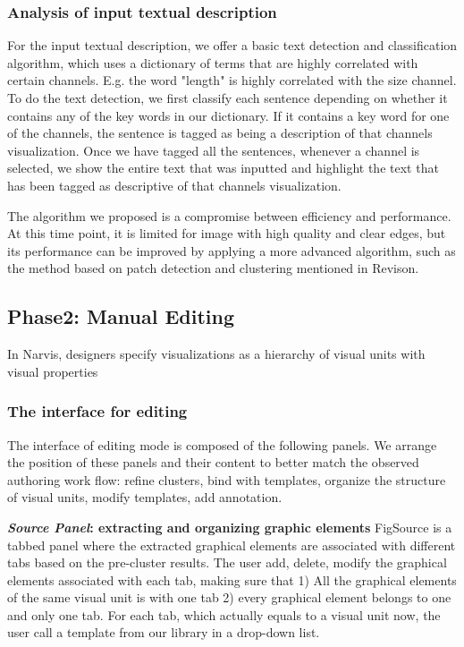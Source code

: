 \subsubsection{Analysis of input textual description}
For the input textual description, we offer a basic text detection and classification algorithm, which uses a dictionary of terms that are highly correlated with certain channels. E.g. the word "length" is highly correlated with the size channel. To do the text detection, we first classify each sentence depending on whether it contains any of the key words in our dictionary. If it contains a key word for one of the channels, the sentence is tagged as being a description of that channels visualization. Once we have tagged all the sentences, whenever a channel is selected, we show the entire text that was inputted and highlight the text that has been tagged as descriptive of that channels visualization.

The algorithm we proposed is a compromise between efficiency and performance. At this time point, it is limited for image with high quality and clear edges, but its performance can be improved by applying a more advanced algorithm, such as the method based on patch detection and clustering mentioned in Revison\cite{savva_revision:_2011}.

\subsection{Phase2: Manual Editing}
In Narvis, designers specify visualizations as a hierarchy of visual units with visual properties

\subsubsection{The interface for editing}
The interface of editing mode is composed of the following panels. We arrange the position of these panels and their content to better match the observed authoring work flow: refine clusters, bind with templates, organize the structure of visual units, modify templates, add annotation. 

\textbf{\textit{Source Panel}: extracting and organizing graphic elements}
FigSource is a tabbed panel where the extracted graphical elements are associated with different tabs based on the pre-cluster results. The user add, delete, modify the graphical elements associated with each tab, making sure that 1) All the graphical elements of the same visual unit is with one tab 2) every graphical element belongs to one and only one tab. For each tab, which actually equals to a visual unit now, the user call a template from our library in a drop-down list. 

